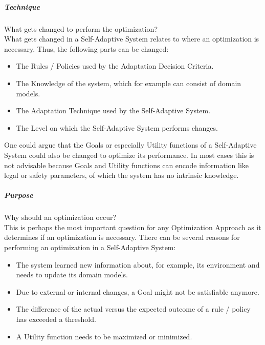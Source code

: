 \subparagraph*{Technique}
What gets changed to perform the optimization? \\
What gets changed in a Self-Adaptive System relates to where an optimization is necessary.
Thus, the following parts can be changed:
\begin{itemize}[nosep]
    \item The Rules / Policies used by the Adaptation Decision Criteria.
    \item The Knowledge of the system, which for example can consist of domain models.
    \item The Adaptation Technique used by the Self-Adaptive System.
    \item The Level on which the Self-Adaptive System performs changes.
\end{itemize}
One could argue that the Goals or especially Utility functions of a Self-Adaptive System could also be changed to optimize its performance.
In most cases this is not advisable because Goals and Utility functions can encode information
like legal or safety parameters, of which the system has no intrinsic knowledge.

\subparagraph*{Purpose}
Why should an optimization occur? \\
This is perhaps the most important question for any Optimization Approach as it determines if an optimization is necessary.
There can be several reasons for performing an optimization in a Self-Adaptive System:
\begin{itemize}[nosep]
    \item The system learned new information about, for example, its environment and needs to update its domain models.
    \item Due to external or internal changes, a Goal might not be satisfiable anymore.
    \item The difference of the actual versus the expected outcome of a rule / policy has exceeded a threshold.
    \item A Utility function needs to be maximized or minimized.
\end{itemize}

